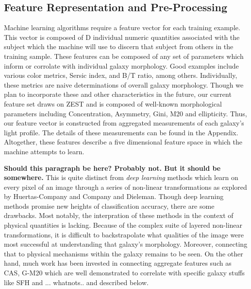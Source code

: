 \documentclass[twocolumn]{aastex6}
\begin{document}
\subsection{Feature Representation and Pre-Processing}
Machine learning algorithms require a feature vector for each training example. This vector is composed of D individual numeric quantities associated with the subject which the machine will use to discern that subject from others in the training sample. These features can be composed of any set of parameters which inform or corrolate with individual galaxy morphology. Good examples include various color metrics, Sersic index, and B/T ratio, among others. Individually, these metrics are naive determinations of overall galaxy morphology. Though we plan to incorporate these and other characteristics in the future, our current feature set draws on ZEST \citep{Scarlata2007} and  is composed of well-known morphological parameters including Concentration, Asymmetry, Gini, M20 and ellipticity. Thus, our feature vector is constructed from aggregated measurements of each galaxy's light profile. The details of these measurements can be found in the Appendix.  Altogether, these features describe a five dimensional feature space in which the machine attempts to learn. 

\textbf{Should this paragraph be here? Probably not. But it should be somewhere.}
This is quite distinct from \textit{deep learning} methods which learn on every pixel of an image through a series of non-linear transformations as explored by Huertas-Company and Company and Dieleman. Though deep learning methods promise new heights of classification accuracy, there are some drawbacks. Most notably, the interpration of these methods in the context of physical quantities is lacking. Because of the complex suite of layered non-linear transformations, it is difficult to backstrapolate what qualities of the image were most successful at understanding that galaxy's morphology. Moreover, connecting that to physical mechanisms within the galaxy remains to be seen. On the other hand, much work has been invested in connecting aggregate features such as CAS, G-M20 which are well demonstrated to correlate with specific galaxy stuffs like SFH and ... whatnots.. and described below.
\end{document}
